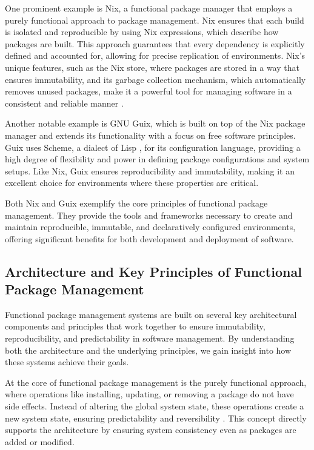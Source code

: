 One prominent example is Nix, a functional package manager that employs a purely
functional approach to package management. Nix ensures that each build is isolated
and reproducible by using Nix expressions, which describe how packages are built.
This approach guarantees that every dependency is explicitly defined and accounted for,
allowing for precise replication of environments. Nix's unique features, such as the
Nix store, where packages are stored in a way that ensures immutability, and its garbage
collection mechanism, which automatically removes unused packages, make it a powerful
tool for managing software in a consistent and reliable manner
\cite[Section 2.2]{courtesFunctionalPackageManagement2013}.

Another notable example is GNU Guix, which is built on top of the Nix package manager
\cite{AcknowledgmentsGNUGuix} and extends its functionality with a focus on free
software principles. Guix uses Scheme, a dialect of Lisp \cite{LispProgrammingLanguage2024},
for its configuration language, providing a high degree of flexibility and power in
defining package configurations and system setups. Like Nix, Guix ensures reproducibility
and immutability, making it an excellent choice for environments where these properties
are critical.

Both Nix and Guix exemplify the core principles of functional package management.
They provide the tools and frameworks necessary to create and maintain reproducible,
immutable, and declaratively configured environments, offering significant benefits
for both development and deployment of software.

\subsection{Architecture and Key Principles of Functional Package Management}

Functional package management systems are built on several key architectural components
and principles that work together to ensure immutability, reproducibility, and predictability
in software management. By understanding both the architecture and the underlying principles,
we gain insight into how these systems achieve their goals.

At the core of functional package management is the purely functional approach, where operations
like installing, updating, or removing a package do not have side effects. Instead of altering
the global system state, these operations create a new system state, ensuring predictability
and reversibility \cite[Section 2.1]{courtesFunctionalPackageManagement2013}. This concept
directly supports the architecture by ensuring system consistency even as packages are added
or modified.

